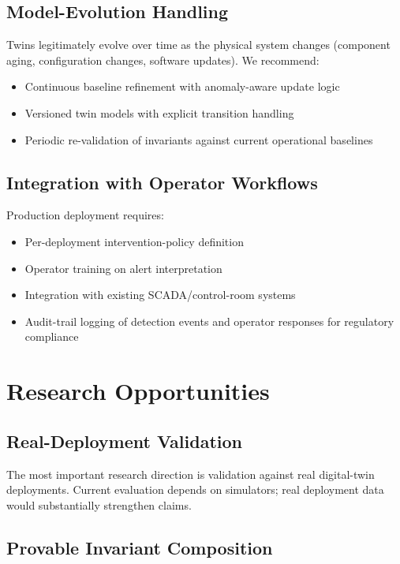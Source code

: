 \documentclass[sigconf,nonacm]{acmart}
\begin{document}
\subsection{Model-Evolution Handling}

Twins legitimately evolve over time as the physical system
changes (component aging, configuration changes, software
updates). We recommend:

\begin{itemize}
  \item Continuous baseline refinement with anomaly-aware update
        logic
  \item Versioned twin models with explicit transition handling
  \item Periodic re-validation of invariants against current
        operational baselines
\end{itemize}

\subsection{Integration with Operator Workflows}

Production deployment requires:

\begin{itemize}
  \item Per-deployment intervention-policy definition
  \item Operator training on alert interpretation
  \item Integration with existing SCADA/control-room systems
  \item Audit-trail logging of detection events and operator
        responses for regulatory compliance
\end{itemize}

\section{Research Opportunities}

\subsection{Real-Deployment Validation}

The most important research direction is validation against
real digital-twin deployments. Current evaluation depends on
simulators; real deployment data would substantially strengthen
claims.

\subsection{Provable Invariant Composition}
\end{document}
